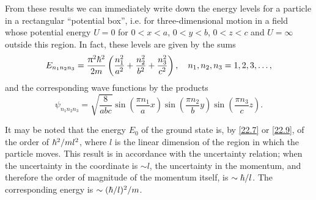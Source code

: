 From these results we can immediately write down the energy levels for a particle in a rectangular “potential box”, i.e. for three-dimensional motion in a field whose potential energy $ U = 0 $ for $ 0 < x < a $, $ 0 < y < b $, $ 0 < z < c $ and $ U = \infty $ outside this region. In fact, these levels are given by the sums
\begin{equation}\label{22.9}
E_{n_1n_2n_3}=\frac{\uppi^2\hbar^2}{2m}\left(\frac{n_1^2}{a^2}+\frac{n_2^2}{b^2}+\frac{n_3^2}{c^2} \right),\quad n_1,n_2,n_3=1,2,3,\dots,
\end{equation}
and the corresponding wave functions by the products
\begin{equation}\label{22.10}
\psi_{n_1n_2n_3}=\sqrt{\frac{8}{abc}}\sin\left(\frac{\pi n_1}{a}x \right)\sin\left(\frac{\pi n_2}{b}y \right)\sin\left(\frac{\pi n_3}{c}z \right).
\end{equation}


It may be noted that the energy $ E_0 $ of the ground state is, by \eqref{22.7} or \eqref{22.9}, of the order of $ \hbar^2/ml^2 $, where $ l $ is the linear dimension of the region in which the particle moves. This result is in accordance with the uncertainty relation; when the uncertainty in the coordinate is $ \sim l $, the uncertainty in the momentum, and therefore the order of magnitude of the momentum itself, is $\sim \hbar/l $. The corresponding energy is $\sim (\hbar/l)^2/m $.



